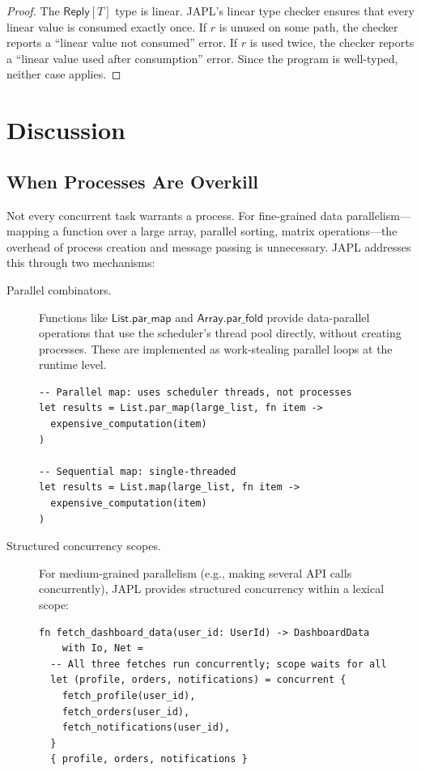 \documentclass[11pt,a4paper]{article}
\begin{document}
\begin{proof}
The $\mathsf{Reply}[T]$ type is linear. JAPL's linear type checker ensures that every linear value is consumed exactly once. If $r$ is unused on some path, the checker reports a ``linear value not consumed'' error. If $r$ is used twice, the checker reports a ``linear value used after consumption'' error. Since the program is well-typed, neither case applies.
\end{proof}


\section{Discussion}\label{sec:discussion}

\subsection{When Processes Are Overkill}

Not every concurrent task warrants a process. For fine-grained data parallelism---mapping a function over a large array, parallel sorting, matrix operations---the overhead of process creation and message passing is unnecessary. JAPL addresses this through two mechanisms:

\begin{description}
\item[Parallel combinators.] Functions like $\mathsf{List.par\_map}$ and $\mathsf{Array.par\_fold}$ provide data-parallel operations that use the scheduler's thread pool directly, without creating processes. These are implemented as work-stealing parallel loops at the runtime level.

\begin{lstlisting}[language=japl,caption={Data parallelism without processes}]
-- Parallel map: uses scheduler threads, not processes
let results = List.par_map(large_list, fn item ->
  expensive_computation(item)
)

-- Sequential map: single-threaded
let results = List.map(large_list, fn item ->
  expensive_computation(item)
)
\end{lstlisting}

\item[Structured concurrency scopes.] For medium-grained parallelism (e.g., making several API calls concurrently), JAPL provides structured concurrency within a lexical scope:

\begin{lstlisting}[language=japl,caption={Structured concurrency scope}]
fn fetch_dashboard_data(user_id: UserId) -> DashboardData
    with Io, Net =
  -- All three fetches run concurrently; scope waits for all
  let (profile, orders, notifications) = concurrent {
    fetch_profile(user_id),
    fetch_orders(user_id),
    fetch_notifications(user_id),
  }
  { profile, orders, notifications }
\end{lstlisting}
\end{description}
\end{document}
